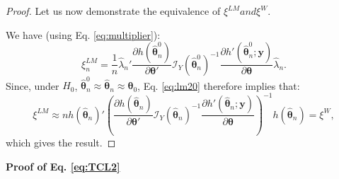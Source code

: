 \documentclass[
  11pt,
]{book}
\theoremstyle{definition}
\theoremstyle{definition}
\theoremstyle{definition}
\theoremstyle{definition}
\theoremstyle{remark}
\begin{document}
\begin{proof}
Let us now demonstrate the equivalence of \(\xi^{LM} and \xi^{W}\).

We have (using Eq. \eqref{eq:multiplier}):
\[
\xi^{LM}_n = \frac{1}{n}\hat\lambda_n' \dfrac{\partial h(\hat{\boldsymbol\theta}^0_n)}{\partial \boldsymbol\theta'} \mathcal{I}_Y(\hat{\boldsymbol\theta}^0_n)^{-1}
\frac{\partial h'(\hat{\boldsymbol\theta}^0_n;\mathbf{y})}{\partial \boldsymbol\theta} \hat\lambda_n.
\]
Since, under \(H_0\), \(\hat{\boldsymbol\theta}_n^0\approx\hat{\boldsymbol\theta}_n \approx {\boldsymbol\theta}_0\), Eq. \eqref{eq:lm20} therefore implies that:
\[
\xi^{LM} \approx n h(\hat{\boldsymbol\theta}_n)' \left(
\dfrac{\partial h(\hat{\boldsymbol\theta}_n)}{\partial \boldsymbol\theta'} \mathcal{I}_Y(\hat{\boldsymbol\theta}_n)^{-1}
\frac{\partial h'(\hat{\boldsymbol\theta}_n;\mathbf{y})}{\partial \boldsymbol\theta}
\right)^{-1}
h(\hat{\boldsymbol\theta}_n) = \xi^{W},
\]
which gives the result.
\end{proof}

\textbf{Proof of Eq. \eqref{eq:TCL2}}
\end{document}
